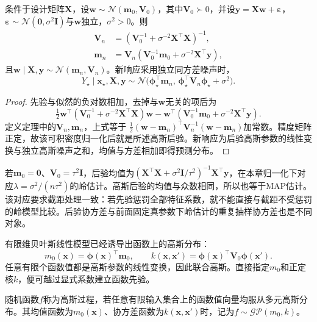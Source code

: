 \begin{theorem}[贝叶斯线性回归的后验与预测]
  \label{thm:regression-bayesian-linear}
  条件于设计矩阵$\bm{X}$，设$\bm{w}\sim\mathcal{N}(\bm{m}_0,\bm{V}_0)$，其中$\bm{V}_0\succ0$，并设$\bm{y}=\bm{X}\bm{w}+\bm{\varepsilon}$，$\bm{\varepsilon}\sim\mathcal{N}(\bm{0},\sigma^2\bm{I})$与$\bm{w}$独立，$\sigma^2>0$。则
  \[
    \begin{aligned}
      \bm{V}_n&=(\bm{V}_0^{-1}+\sigma^{-2}\bm{X}^{\top}\bm{X})^{-1},\\
      \bm{m}_n&=\bm{V}_n
          (\bm{V}_0^{-1}\bm{m}_0+\sigma^{-2}\bm{X}^{\top}\bm{y}),
    \end{aligned}
  \]
  且$\bm{w}\mid\bm{X},\bm{y}\sim\mathcal{N}(\bm{m}_n,\bm{V}_n)$。新响应采用独立同方差噪声时，
  \[
    Y_{\star}\mid\bm{x}_{\star},\bm{X},\bm{y}
    \sim\mathcal{N}\bigl(
      \bm{\phi}_{\star}^{\top}\bm{m}_n,\,
      \bm{\phi}_{\star}^{\top}\bm{V}_n\bm{\phi}_{\star}+\sigma^2\bigr).
  \]
\end{theorem}

\begin{proof}
先验与似然的负对数相加，去掉与$\bm{w}$无关的项后为
\[
  \tfrac12\bm{w}^{\top}
       (\bm{V}_0^{-1}+\sigma^{-2}\bm{X}^{\top}\bm{X})\bm{w}
  -\bm{w}^{\top}
       (\bm{V}_0^{-1}\bm{m}_0+\sigma^{-2}\bm{X}^{\top}\bm{y}).
\]
定义定理中的$\bm{V}_n,\bm{m}_n$，上式等于
$\tfrac12(\bm{w}-\bm{m}_n)^{\top}\bm{V}_n^{-1}(\bm{w}-\bm{m}_n)$加常数。精度矩阵正定，故该可积密度归一化后就是所述高斯后验。新响应为后验高斯参数的线性变换与独立高斯噪声之和，均值与方差相加即得预测分布。
\end{proof}

若$\bm{m}_0=\bm{0}$、$\bm{V}_0=\tau^2\bm{I}$，后验均值为$(\bm{X}^{\top}\bm{X}+\sigma^2\bm{I}/\tau^2)^{-1}\bm{X}^{\top}\bm{y}$，在本章归一化下对应$\lambda=\sigma^2/(n\tau^2)$的岭估计。高斯后验的均值与众数相同，所以也等于MAP估计。该对应要求截距处理一致：若先验惩罚全部特征系数，就不能直接与截距不受惩罚的岭模型比较。后验协方差与前面固定真参数下岭估计的重复抽样协方差也是不同对象。

有限维贝叶斯线性模型已经诱导出函数上的高斯分布：
\[
  m_0(\bm{x})=\bm{\phi}(\bm{x})^{\top}\bm{m}_0,\qquad
  k(\bm{x},\bm{x}')=\bm{\phi}(\bm{x})^{\top}\bm{V}_0\bm{\phi}(\bm{x}').
\]
任意有限个函数值都是高斯参数的线性变换，因此联合高斯。直接指定$m_0$和正定核$k$，便可越过显式系数建立函数先验。

\begin{definition}[高斯过程]
  \label{def:regression-gp}
  随机函数$f$称为高斯过程，若任意有限输入集合上的函数值向量均服从多元高斯分布。其均值函数为$m_0(\bm{x})$、协方差函数为$k(\bm{x},\bm{x}')$时，记为$f\sim\mathcal{GP}(m_0,k)$。
\end{definition}

